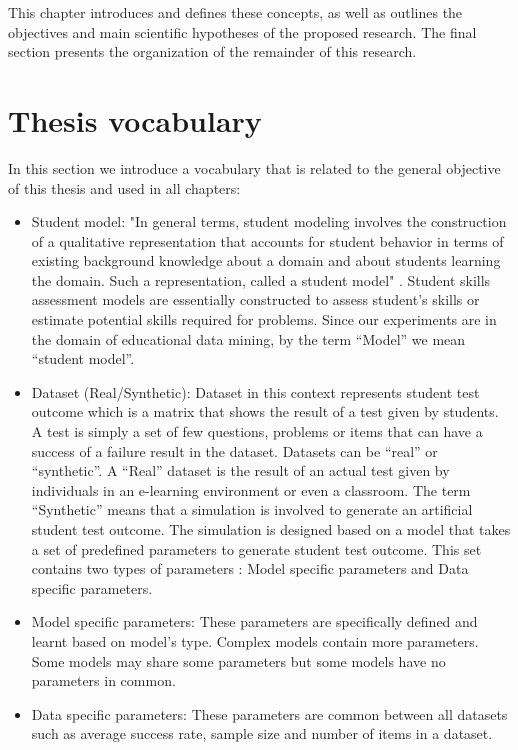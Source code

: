 This chapter introduces and defines these concepts, as well as outlines the objectives and main scientific hypotheses of the proposed research. The final section presents the organization of the remainder of this research.

\section{Thesis vocabulary}

In this section we introduce a vocabulary that is related to the general objective of this thesis and used in all chapters:

\begin{itemize}
\item Student model: "In general terms, student modeling involves the construction of a qualitative representation that accounts for student behavior in terms of existing background knowledge about a domain and about students learning the domain. Such a representation, called a student model" \citep{sison1998student}. Student skills assessment models are essentially constructed to assess student's skills or estimate potential skills required for problems. Since our experiments are in the domain of educational data mining, by the term ``Model'' we mean ``student model''. 
\item Dataset (Real/Synthetic): Dataset in this context represents student test outcome which is a matrix that shows the result of a test given by students. A test is simply a set of few questions, problems or items that can have a success of a failure result in the dataset. Datasets can be ``real'' or ``synthetic''. A ``Real'' dataset is the result of an actual test given by individuals in an e-learning environment or even a classroom. The term ``Synthetic'' means that a simulation is involved to generate an artificial student test outcome. The simulation is designed based on a model that takes a set of predefined parameters to generate student test outcome. This set contains two types of parameters : Model specific parameters and Data specific parameters.
\item Model specific parameters: These parameters are specifically defined and learnt based on model's type. Complex models contain more parameters. Some models may share some parameters but some models have no parameters in common.
\item Data specific parameters: These parameters are common between all datasets such as average success rate, sample size and number of items in a dataset.

\end{itemize}
